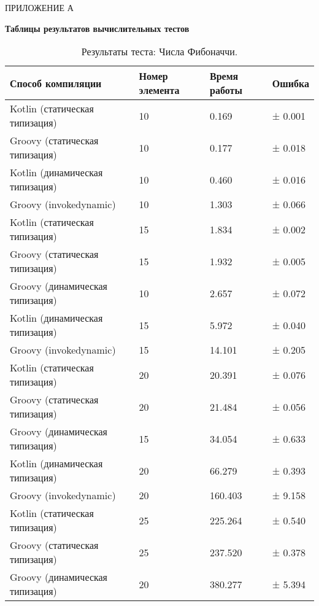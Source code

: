 \vfill
\clearpage
\appendix


    \hfill ПРИЛОЖЕНИЕ А
    \begin{center}
        \bf{Таблицы результатов вычислительных тестов}
    \end{center}
    \markboth{\MakeUppercase{}}{}
    
    \begin{table}[h]
\caption{\label{tab:fibBenchResults}Результаты теста: Числа Фибоначчи.}
\begin{center}
\begin{tabular}{|l|p{}|l|l|}
\hline
Способ компиляции & Номер элемента & Время работы & Ошибка \\
\hline
Kotlin (статическая типизация)          & 10 &    0.169 & ±   0.001\\
Groovy (статическая типизация)          & 10 &    0.177 & ±   0.018\\
Kotlin (динамическая типизация)         & 10 &    0.460 & ±   0.016\\
Groovy (invokedynamic)                  & 10 &    1.303 & ±   0.066\\
Kotlin (статическая типизация)          & 15 &    1.834 & ±   0.002\\
Groovy (статическая типизация)          & 15 &    1.932 & ±   0.005\\
Groovy (динамическая типизация)         & 10 &    2.657 & ±   0.072\\
Kotlin (динамическая типизация)         & 15 &    5.972 & ±   0.040\\
Groovy (invokedynamic)                  & 15 &   14.101 & ±   0.205\\
Kotlin (статическая типизация)          & 20 &   20.391 & ±   0.076\\
Groovy (статическая типизация)          & 20 &   21.484 & ±   0.056\\
Groovy (динамическая типизация)         & 15 &   34.054 & ±   0.633\\
Kotlin (динамическая типизация)         & 20 &   66.279 & ±   0.393\\
Groovy (invokedynamic)                  & 20 &  160.403 & ±   9.158\\
Kotlin (статическая типизация)          & 25 &  225.264 & ±   0.540\\
Groovy (статическая типизация)          & 25 &  237.520 & ±   0.378\\
Groovy (динамическая типизация)         & 20 &  380.277 & ±   5.394\\

\end{tabular}
\end{center}
\end{table}
